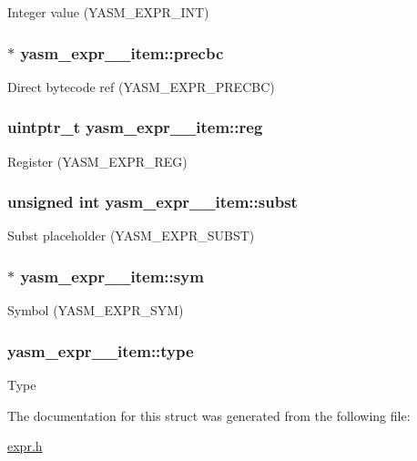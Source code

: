 Integer value (Y\-A\-S\-M\-\_\-\-E\-X\-P\-R\-\_\-\-I\-N\-T) \hypertarget{structyasm__expr____item_a8b0b9a18440fe185f304a45229ee5921}{
\subsubsection[{precbc}]{$\ast$ yasm\-\_\-expr\-\_\-\-\_\-item\-::precbc}}\label{structyasm__expr____item_a8b0b9a18440fe185f304a45229ee5921}
Direct bytecode ref (Y\-A\-S\-M\-\_\-\-E\-X\-P\-R\-\_\-\-P\-R\-E\-C\-B\-C) \hypertarget{structyasm__expr____item_a397bae2de73a33c8913308ff90012329}{
\subsubsection[{reg}]{\setlength{\rightskip}{0pt plus 5cm}uintptr\-\_\-t yasm\-\_\-expr\-\_\-\-\_\-item\-::reg}}\label{structyasm__expr____item_a397bae2de73a33c8913308ff90012329}
Register (Y\-A\-S\-M\-\_\-\-E\-X\-P\-R\-\_\-\-R\-E\-G) \hypertarget{structyasm__expr____item_afd018d97c98b7b24cf695e70b1bf3871}{
\subsubsection[{subst}]{\setlength{\rightskip}{0pt plus 5cm}unsigned int yasm\-\_\-expr\-\_\-\-\_\-item\-::subst}}\label{structyasm__expr____item_afd018d97c98b7b24cf695e70b1bf3871}
Subst placeholder (Y\-A\-S\-M\-\_\-\-E\-X\-P\-R\-\_\-\-S\-U\-B\-S\-T) \hypertarget{structyasm__expr____item_a281ff29799f1620de3a1fb327c507c5f}{
\subsubsection[{sym}]{$\ast$ yasm\-\_\-expr\-\_\-\-\_\-item\-::sym}}\label{structyasm__expr____item_a281ff29799f1620de3a1fb327c507c5f}
Symbol (Y\-A\-S\-M\-\_\-\-E\-X\-P\-R\-\_\-\-S\-Y\-M) \hypertarget{structyasm__expr____item_a267df87d11012e9046df717f33f413b0}{
\subsubsection[{type}]{ yasm\-\_\-expr\-\_\-\-\_\-item\-::type}}\label{structyasm__expr____item_a267df87d11012e9046df717f33f413b0}
Type 

The documentation for this struct was generated from the following file\-:\begin{DoxyCompactItemize}
\item 
\hyperlink{expr_8h}{expr.\-h}\end{DoxyCompactItemize}
